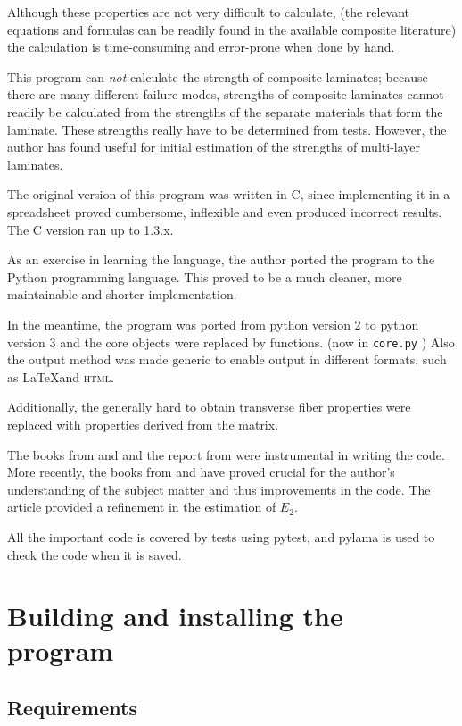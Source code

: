 \documentclass[a4paper,landscape,oneside,11pt,twocolumn]{memoir}
\begin{document}
Although these properties are not very difficult to calculate, (the relevant
equations and formulas can be readily found in the available composite
literature) the calculation is time-consuming and error-prone when done by
hand.

This program can \emph{not} calculate the strength of composite laminates;
because there are many different failure modes, strengths of composite
laminates cannot readily be calculated from the strengths of the separate
materials that form the laminate. These strengths really have to be determined from
tests. However, the author has found \citet{1992WeiEn..52...29H} useful for
initial estimation of the strengths of multi-layer laminates.

The original version of this program was written in C, since implementing
it in a spreadsheet proved cumbersome, inflexible and even produced
incorrect results. The C version ran up to 1.3.x.

As an exercise in learning the language, the author ported the program to
the Python programming language. This proved to be a much cleaner, more
maintainable and shorter implementation.

In the meantime, the program was ported from python version 2 to python
version 3 and the core objects were replaced by functions. (now in
\texttt{core.py} ) Also the output method was made generic to enable output in
different formats, such as \LaTeX and \textsc{html}.

Additionally, the generally hard to obtain transverse fiber properties
were replaced with properties derived from the matrix.

The books from \citet{Hyer:1998} and \citet{Tsai:1992} and the report from
\citet{Nettles:1994} were instrumental in writing the code.
More recently, the books from \citet{Bower:2010} and
\citet{Barbero:2008,Barbero:2018} have proved crucial for the
author's understanding of the subject matter and thus improvements in the
code.
The article \citet{Giner:2014} provided a refinement in the estimation of
$E_2$.

All the important code is covered by tests using pytest, and pylama is used to
check the code when it is saved.

\chapter{Building and installing the program} %

\section{Requirements} %
\end{document}
